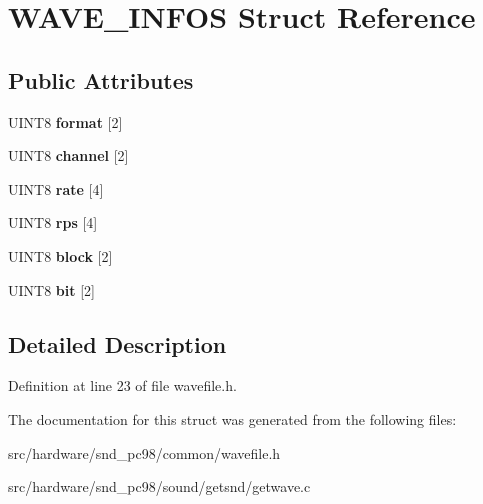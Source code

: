 \hypertarget{structWAVE__INFOS}{\section{W\-A\-V\-E\-\_\-\-I\-N\-F\-O\-S Struct Reference}
\label{structWAVE__INFOS}
}
\subsection*{Public Attributes}
\begin{DoxyCompactItemize}
\item 
\hypertarget{structWAVE__INFOS_a136dd9592594aebd993cfd4b0ba24b45}{U\-I\-N\-T8 {\bfseries format} \mbox{[}2\mbox{]}}\label{structWAVE__INFOS_a136dd9592594aebd993cfd4b0ba24b45}

\item 
\hypertarget{structWAVE__INFOS_a28887c7a5ba863bd48595425d737506d}{U\-I\-N\-T8 {\bfseries channel} \mbox{[}2\mbox{]}}\label{structWAVE__INFOS_a28887c7a5ba863bd48595425d737506d}

\item 
\hypertarget{structWAVE__INFOS_a92b7bdf5f3cc0d756caef4707279c7d7}{U\-I\-N\-T8 {\bfseries rate} \mbox{[}4\mbox{]}}\label{structWAVE__INFOS_a92b7bdf5f3cc0d756caef4707279c7d7}

\item 
\hypertarget{structWAVE__INFOS_a93d293ea8ba7f589489f7a745862025d}{U\-I\-N\-T8 {\bfseries rps} \mbox{[}4\mbox{]}}\label{structWAVE__INFOS_a93d293ea8ba7f589489f7a745862025d}

\item 
\hypertarget{structWAVE__INFOS_a8284433072472971a056c9867563950e}{U\-I\-N\-T8 {\bfseries block} \mbox{[}2\mbox{]}}\label{structWAVE__INFOS_a8284433072472971a056c9867563950e}

\item 
\hypertarget{structWAVE__INFOS_abb8362727f073fa703f1b6948a8aad69}{U\-I\-N\-T8 {\bfseries bit} \mbox{[}2\mbox{]}}\label{structWAVE__INFOS_abb8362727f073fa703f1b6948a8aad69}

\end{DoxyCompactItemize}


\subsection{Detailed Description}


Definition at line 23 of file wavefile.\-h.



The documentation for this struct was generated from the following files\-:\begin{DoxyCompactItemize}
\item 
src/hardware/snd\-\_\-pc98/common/wavefile.\-h\item 
src/hardware/snd\-\_\-pc98/sound/getsnd/getwave.\-c\end{DoxyCompactItemize}

